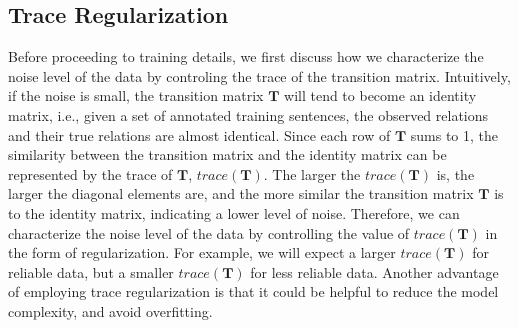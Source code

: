 
\subsection{Trace Regularization}
Before proceeding to training details, we first discuss how we characterize the noise level of the data by controling the trace of the transition matrix.
Intuitively, if the noise is small, the transition matrix $\mathbf{T}$ will tend to become an identity matrix, i.e., given a set of annotated training sentences,  the observed relations and their true relations are almost identical. Since each row of $\mathbf{T}$ sums to 1, the similarity between the transition matrix and the identity matrix can be represented by the trace of $\mathbf{T}$, $trace (\mathbf{T})$. The larger the $trace(\mathbf{T})$ is, the larger the diagonal elements are, and the more similar the transition matrix $\mathbf{T}$ is to the identity matrix, indicating a lower level of noise. Therefore, we can characterize  the noise level of the data by controlling the  value of $trace (\mathbf{T})$ in the form of regularization. For example, we will expect a larger $trace (\mathbf{T})$ for reliable data, but  a smaller $trace (\mathbf{T})$  for less reliable data. Another advantage of employing trace regularization is that it could be helpful to reduce the model complexity,  %
and avoid overfitting.


